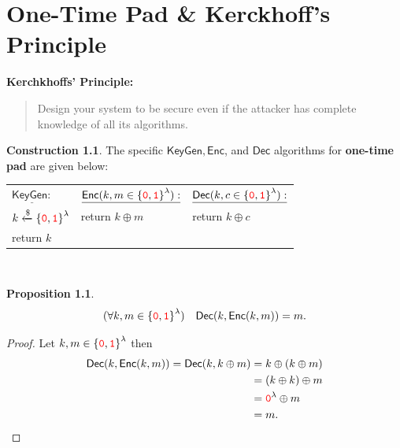 \documentclass[12pt,openany]{book}
\newtheorem{proposition}[theorem]{Proposition}
\theoremstyle{definition}
\newtheorem{construction}{Construction}[chapter]
\newcommand{\set}[1]{\left\{#1\right\}}
\newcommand{\KeyGen}{\mathsf{KeyGen}}
\newcommand{\Enc}{\mathsf{Enc}}
\newcommand{\Dec}{\mathsf{Dec}}
\newcommand{\zero}{\textcolor{red}{\texttt{0}}}
\newcommand{\one}{\textcolor{red}{\texttt{1}}}
\newcommand{\tab}{\hspace{8pt}}
\newcommand{\xor}{\oplus}
\newcommand{\randomness}{\$}
\newcommand{\uniform}{\xleftarrow{\randomness}}
\newcommand{\binaryfield}{\set{\zero,\one}}
\begin{document}
	\chapter{One-Time Pad \& Kerckhoff's Principle}
	
	\begin{tcolorbox}[colback=white,colframe=gray,arc=5pt,title={\color{white}\bf }]
		\textbf{Kerchkhoffs' Principle:}
		\begin{quote}
			Design your system to be secure even if the attacker has complete knowledge of all its algorithms.
		\end{quote}
	\end{tcolorbox}
	\vspace{8pt}
	\begin{tcolorbox}[colback=white,colframe=defcolor,arc=5pt,title={\color{white}\bf One-time Pad (OTP)}]
		\begin{construction}
			The specific \(\KeyGen,\Enc\), and \(\Dec\) algorithms for \textbf{one-time pad} are given below: \begin{center}
				\begin{tabular}{|lll|}
					\hline
					$\underline{\KeyGen:}$ & \(\underline{\Enc(k,m\in\binaryfield^\lambda):}\) & \(\underline{\Dec(k,c\in\binaryfield^\lambda):}\)\\
					\tab$k\uniform\binaryfield^\lambda$ & \tab return \(k\xor m\) & \tab return \(k\xor c\)\\
					\tab return $k$ &&\\
					\hline
				\end{tabular}\\
			\end{center}
		\end{construction}
	\end{tcolorbox}
	\vspace{8pt}
	\begin{tcolorbox}[colback=white,colframe=procolor,arc=5pt,title={\color{white}\bf Corectness of OTP}]
		\begin{proposition}
			\[
			(\forall k,m\in\binaryfield^\lambda)\quad\Dec(k,\Enc(k,m))=m.
			\]
		\end{proposition}
	\end{tcolorbox}
	\begin{proof}
		Let \(k,m\in\binaryfield^\lambda\) then \begin{align*}
			\Dec(k,\Enc(k,m))=\Dec(k,k\xor m)&=k\xor(k\xor m)\\
			&=(k\xor k)\xor m\\
			&=\zero^\lambda\xor m\\
			&=m.
		\end{align*}
	\end{proof}
\end{document}
